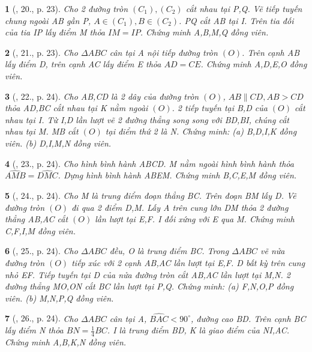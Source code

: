 \documentclass{article}
\newtheorem{baitoan}{}
\begin{document}
\begin{baitoan}[\cite{Thu_Chung_Viet_Minh_circ}, 20., p. 23]
	Cho 2 đường tròn $(C_1),(C_2)$ cắt nhau tại P,Q. Vẽ tiếp tuyến chung ngoài AB gần P, $A\in(C_1),B\in(C_2)$. PQ cắt AB tại I. Trên tia đối của tia IP lấy điểm M thỏa $IM = IP$. Chứng minh A,B,M,Q đồng viên.
\end{baitoan}

\begin{baitoan}[\cite{Thu_Chung_Viet_Minh_circ}, 21., p. 23]
	Cho $\Delta ABC$ cân tại A nội tiếp đường tròn $(O)$. Trên cạnh AB lấy điểm D, trên cạnh AC lấy điểm E thỏa $AD = CE$. Chứng minh A,D,E,O đồng viên.
\end{baitoan}

\begin{baitoan}[\cite{Thu_Chung_Viet_Minh_circ}, 22., p. 24]
	Cho AB,CD là 2 dây của đường tròn $(O)$, $AB\parallel CD,AB > CD$ thỏa AD,BC cắt nhau tại K nằm ngoài $(O)$. 2 tiếp tuyến tại B,D của $(O)$ cắt nhau tại I. Từ I,D lần lượt vẽ 2 đường thẳng song song với BD,BI, chúng cắt nhau tại M. MB cắt $(O)$ tại điểm thứ 2 là N. Chứng minh: (a) B,D,I,K đồng viên. (b) D,I,M,N đồng viên.
\end{baitoan}

\begin{baitoan}[\cite{Thu_Chung_Viet_Minh_circ}, 23., p. 24]
	Cho hình bình hành ABCD. M nằm ngoài hình bình hành thỏa $\widehat{AMB} = \widehat{DMC}$. Dựng hình bình hành ABEM. Chứng minh B,C,E,M đồng viên.
\end{baitoan}

\begin{baitoan}[\cite{Thu_Chung_Viet_Minh_circ}, 24., p. 24]
	Cho M là trung điểm đoạn thẳng BC. Trên đoạn BM lấy D. Vẽ đường tròn $(O)$ đi qua 2 điểm D,M. Lấy A trên cung lớn DM thỏa 2 đường thẳng AB,AC cắt $(O)$ lần lượt tại E,F. I đối xứng với E qua M. Chứng minh C,F,I,M đồng viên.
\end{baitoan}

\begin{baitoan}[\cite{Thu_Chung_Viet_Minh_circ}, 25., p. 24]
	Cho $\Delta ABC$ đều, O là trung điểm BC. Trong $\Delta ABC$ vẽ nửa đường tròn $(O)$ tiếp xúc với 2 cạnh AB,AC lần lượt tại E,F. D bất kỳ trên cung nhỏ EF. Tiếp tuyến tại D của nửa đường tròn cắt AB,AC lần lượt tại M,N. 2 đường thẳng MO,ON cắt BC lần lượt tại P,Q. Chứng minh: (a) F,N,O,P đồng viên. (b) M,N,P,Q đồng viên.
\end{baitoan}

\begin{baitoan}[\cite{Thu_Chung_Viet_Minh_circ}, 26., p. 24]
	Cho $\Delta ABC$ cân tại A, $\widehat{BAC} < 90^\circ$, đường cao BD. Trên cạnh BC lấy điểm N thỏa $BN = \frac{1}{4}BC$. I là trung điểm BD, K là giao điểm của NI,AC. Chứng minh A,B,K,N đồng viên.
\end{baitoan}
\end{document}
